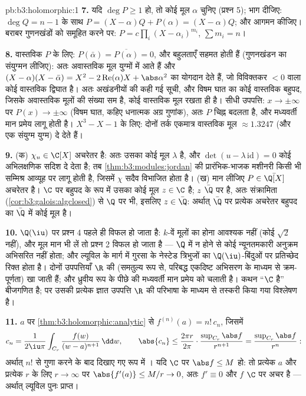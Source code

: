 \begin{solution}{pb:b3:holomorphic:1}
\textbf{7.} यदि $\deg P \geq 1$ हो, तो कोई मूल $\alpha$ चुनिए (प्रश्न 5); भाग
दीजिए: $\deg Q = n - 1$ के साथ $P = (X - \alpha)Q + P(\alpha) = (X -
\alpha)Q$; और आगमन कीजिए। बराबर गुणनखंडों को समूहित
करने पर: $P = c\prod_i(X - \alpha_i)^{m_i}$, $\sum m_i = n$।

\textbf{8.} वास्तविक $P$ के लिए: $P(\bar\alpha) =
\overline{P(\alpha)} = 0$, और बहुलताएँ सहमत होती हैं
(गुणनखंडन का संयुग्मन लीजिए): अतः अवास्तविक मूल युग्मों में आते हैं
और $(X - \alpha)(X - \bar\alpha) = X^2 -
2\operatorname{Re}(\alpha)X + \abs\alpha^2$ का योगदान देते हैं, जो विविक्तकर $< 0$ वाला कोई वास्तविक
द्विघात है। अतः अखंडनीयों की कही गई सूची, और विषम घात का कोई वास्तविक
बहुपद, जिसके अवास्तविक मूलों की संख्या सम है, कोई वास्तविक मूल रखता
ही है। सीधी उपपत्ति: $x \to \pm\infty$ पर $P(x) \to \pm\infty$ (विषम घात, कहिए धनात्मक अग्र
गुणांक), अतः $P$ चिह्न बदलता है, और मध्यवर्ती मान प्रमेय लागू होती
है। $X^3 - X - 1$ के लिए: दोनों तर्क एकमात्र वास्तविक मूल $\approx 1.3247$ (और एक संयुग्म
युग्म) दे देते हैं।

\textbf{9.} (क) $\chi_u \in \C[X]$ अचरेतर है: अतः उसका कोई मूल $\lambda$ है, और $\det(u - \lambda\,\mathrm{id}) = 0$
कोई अभिलक्षणिक सदिश दे देता है; तब \cref{thm:b3:modules:jordan} की प्रारंभिक-भाजक मशीनरी
किसी भी सम्मिश्र आव्यूह पर लागू होती है, जिसमें $\chi$ सदैव विभाजित
होता है। (ख) मान लीजिए $P \in \bar\Q[X]$ अचरेतर है। $\C$ पर बहुपद के रूप में
उसका कोई मूल $z
\in \C$ है; $z$ $\bar\Q$ पर  है, अतः संक्रामिता (\cref{cor:b3:galois:algclosed})
से $\Q$ पर भी, इसलिए $z \in
\bar\Q$: अर्थात् $\bar\Q$ पर प्रत्येक अचरेतर बहुपद
का $\bar\Q$ में कोई मूल है।

\textbf{10.} $\Q(\iu)$ पर प्रश्न 4 पहले ही विफल हो जाता है: $k$-वें
मूलों का होना आवश्यक नहीं (कोई $\sqrt2$ नहीं), और मूल मान भी लें तो
प्रश्न 2 विफल हो जाता है --- $\Q$ में  न होने से कोई
न्यूनतमकारी अनुक्रम अभिसरित नहीं होता; और ल्यूविल के मार्ग में गुरसा
के नेस्टेड  त्रिभुजों का $\Q(\iu)$-बिंदुओं पर प्रतिच्छेद रिक्त होता
है। दोनों उपपत्तियाँ $\R$ की  (समतुल्य रूप से, परिबद्ध
एकदिष्ट अभिसरण के माध्यम से क्रम-पूर्णता) खा जाती हैं; और 
ध्रुवीय रूप के पीछे की मध्यवर्ती मान प्रमेय को चलाती है। कथन ``$\C$
 है'' बीजगणित है; पर उसकी प्रत्येक ज्ञात उपपत्ति
$\R$ की परिभाषा के माध्यम से तस्करी किया गया विश्लेषण है।

\textbf{11.} $a$ पर \cref{thm:b3:holomorphic:analytic} से $f^{(n)}(a) = n!\,c_n$, जिसमें
\[
c_n = \frac1{2\iu\pi}\int_{C_r}\frac{f(w)}{(w -
a)^{n+1}}\,\dd w,
\qquad
\abs{c_n} \leq \frac{2\pi r}{2\pi}\cdot
\frac{\sup_{C_r}\abs f}{r^{n+1}}
= \frac{\sup_{C_r}\abs f}{r^{n}} :
\]
अर्थात् $n!$ से गुणा करने के बाद दिखाए गए रूप में । यदि
$\C$ पर $\abs f \leq M$ हो: तो प्रत्येक $a$ और प्रत्येक $r$ के लिए $r \to
\infty$
पर $\abs{f'(a)} \leq M/r \to 0$, अतः $f' \equiv 0$ और $f$  $\C$ पर अचर है --- अर्थात्
ल्यूविल पुनः प्राप्त।


\end{solution}
